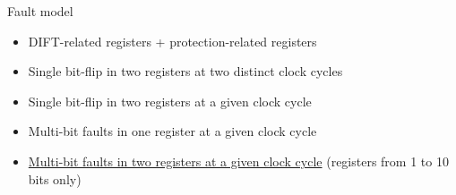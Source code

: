 \begin{frame}{Fault model}
    \begin{block}{}
        \begin{itemize}
            \item DIFT-related registers + protection-related registers
            \item Single bit-flip in two registers at two distinct clock cycles%
            \item Single bit-flip in two registers at a given clock cycle%
            \item Multi-bit faults in one register at a given clock cycle%
            \item \underline{Multi-bit faults in two registers at a given clock cycle} {\tiny (registers from 1 to 10 bits only)}%
        \end{itemize}
    \end{block}
\end{frame}
